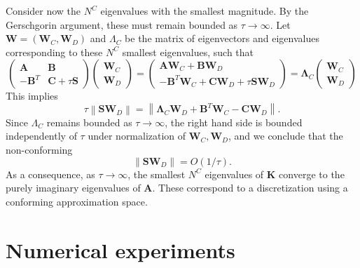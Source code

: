 \documentclass[10pt]{article}
\newcommand{\nor}[1]{\left\| #1 \right\|}
\begin{document}
Consider now the $N^C$ eigenvalues with the smallest magnitude.  By the Gerschgorin argument, these must remain bounded as $\tau \rightarrow \infty$.  Let $\bm{W} = (\bm{W}_C,\bm{W}_D)$ and $\Lambda_C$ be the matrix of eigenvectors and eigenvalues corresponding to these $N^C$ smallest eigenvalues, such that
\[
\left(\begin{array}{cc}
\bm{A} & \bm{B}\\
-\bm{B}^T & \bm{C} + \tau \bm{S}
\end{array}\right)
\left(\begin{array}{c}
\bm{W}_C
\\
\bm{W}_D
\end{array}\right) = 
\left(\begin{array}{c}
\bm{A}\bm{W}_C + \bm{B}\bm{W}_D\\
-\bm{B}^T\bm{W}_C + \bm{C}\bm{W}_D + \tau \bm{S}\bm{W}_D
\end{array}\right)
= 
\bm{\Lambda}_C
\left(\begin{array}{c}
\bm{W}_C
\\
\bm{W}_D
\end{array}\right) 
\]
This implies 
\[
\tau \nor{\bm{S}\bm{W}_D} = \nor{\bm{\Lambda}_C \bm{W}_D + \bm{B}^T\bm{W}_C  - \bm{C}\bm{W}_D}.
\]
Since $\Lambda_C$ remains bounded as $\tau\rightarrow \infty$, the right hand side is bounded independently of $\tau$ under normalization of $\bm{W}_C,\bm{W}_D$, and we conclude that the non-conforming 
\[
\nor{\bm{S}\bm{W}_D} = O(1/\tau).
\]
As a consequence, as $\tau\rightarrow \infty$, the smallest $N^C$ eigenvalues of $\bm{K}$ converge to the purely imaginary eigenvalues of $\bm{A}$.  These correspond to a discretization using a conforming approximation space.  
 
\section{Numerical experiments}







\end{document}

